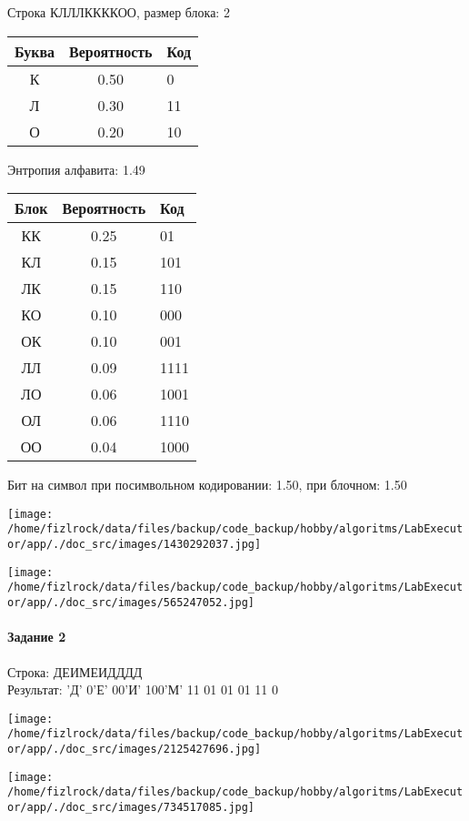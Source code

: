 \documentclass[a4paper, 12pt]{article}
\begin{document}
Строка КЛЛЛККККОО, размер блока: 2
\begin{center}
 \begin{tabular}{ |c|c|l| } 
  \hline
     Буква & Вероятность & Код\\ \hline
К & 0.50 & 0\\\hline
Л & 0.30 & 11\\\hline
О & 0.20 & 10
\\ \hline \end{tabular}
\end{center}
Энтропия алфавита: 1.49
\begin{center}
 \begin{tabular}{ |c|c|l| } 
  \hline
     Блок & Вероятность & Код\\ \hline
КК & 0.25 & 01\\\hline
КЛ & 0.15 & 101\\\hline
ЛК & 0.15 & 110\\\hline
КО & 0.10 & 000\\\hline
ОК & 0.10 & 001\\\hline
ЛЛ & 0.09 & 1111\\\hline
ЛО & 0.06 & 1001\\\hline
ОЛ & 0.06 & 1110\\\hline
ОО & 0.04 & 1000
\\ \hline \end{tabular}
\end{center}
Бит на символ при посимвольном кодировании: 1.50, при блочном: 1.50

\texttt{[image: /home/fizlrock/data/files/backup/code\_backup/hobby/algoritms/LabExecutor/app/./doc\_src/images/1430292037.jpg]}

\texttt{[image: /home/fizlrock/data/files/backup/code\_backup/hobby/algoritms/LabExecutor/app/./doc\_src/images/565247052.jpg]}
\pagebreak
\paragraph{Задание 2}

Строка: 
ДЕИМЕИДДДД\\
Результат: 'Д' 0'Е' 00'И' 100'М' 11 01 01 01 11 0

\texttt{[image: /home/fizlrock/data/files/backup/code\_backup/hobby/algoritms/LabExecutor/app/./doc\_src/images/2125427696.jpg]}

\texttt{[image: /home/fizlrock/data/files/backup/code\_backup/hobby/algoritms/LabExecutor/app/./doc\_src/images/734517085.jpg]}
\end{document}
